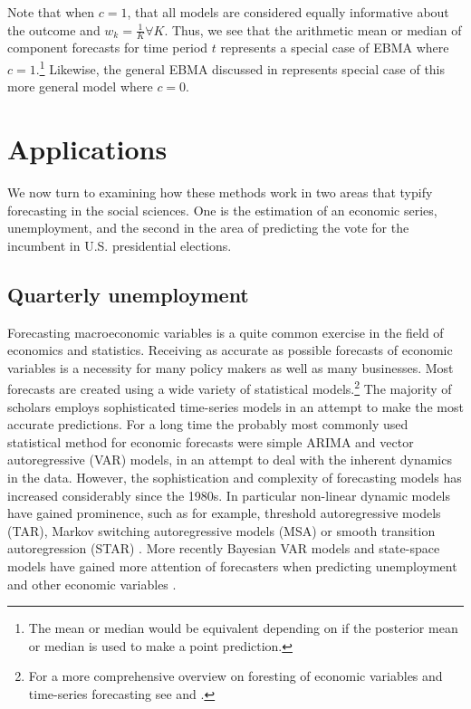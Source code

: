 \documentclass[12pt,fullpage,endnotes]{article}
\begin{document}
Note that when $c=1$, that all models are considered equally
informative about the outcome and $w_k=\frac{1}{K} \forall K$. Thus, we see that the arithmetic mean or
median of component forecasts for time period $t$ represents a special
case of EBMA where $c=1$.\footnote{The mean or median would be
  equivalent depending on if the posterior mean or median is used to
  make a point prediction.}  Likewise, the general EBMA discussed in
\citet{mhw:2012} represents special case of this more general
model where $c=0$.


\section{Applications}
\label{empirics}

We now turn to examining how these methods work in two areas that typify forecasting in
the social sciences. One is the estimation of an economic series, unemployment, and the second in the area of predicting the vote for the incumbent in U.S. presidential elections.


\subsection{Quarterly unemployment}
Forecasting macroeconomic variables is a quite common exercise in the field of economics and statistics. Receiving as accurate as possible forecasts of economic variables is a necessity for many policy makers as well as many businesses. Most forecasts are created using a wide variety of statistical models.\footnote{For a more comprehensive overview on foresting of economic variables and time-series forecasting see \citet{Elliott:Timmermann:2008} and \citet{Goijer:Hyndman:2006}.} 
The majority of scholars employs sophisticated time-series models in an attempt to make the most accurate predictions. For a long time the probably most commonly used statistical method for economic forecasts were simple ARIMA and vector autoregressive (VAR) models, in an attempt to deal with the inherent dynamics in the data. However, the sophistication and complexity of forecasting models has increased considerably since the 1980s. In particular non-linear dynamic models have gained prominence, such as for example, threshold autoregressive models (TAR), Markov switching autoregressive models (MSA) or smooth transition
autoregression (STAR) \citep{Elliott:Timmermann:2008,Montgomery:etal:1998}. More recently Bayesian VAR models and state-space models have gained more attention of forecasters when predicting unemployment and other economic variables \citep{Goijer:Hyndman:2006,Elliott:Timmermann:2008}. 
\end{document}
